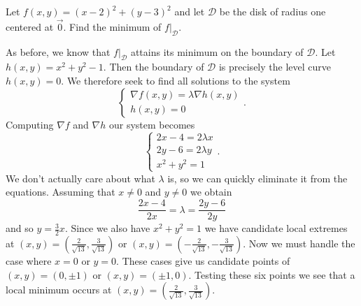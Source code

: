 \begin{example}
	Let $f(x,y)=(x-2)^2+(y-3)^2$
	and let $\mathcal D$ be the disk of radius one centered at $\vec 0$.  Find
	the minimum of $f\big|_{\mathcal D}$.  

	As before, we know that $f\big|_{\mathcal D}$ attains its minimum on the boundary
	of $\mathcal D$.  Let $h(x,y)=x^2+y^2-1$.  Then the boundary of $\mathcal D$
	is precisely the level curve $h(x,y)=0$.
	We therefore seek to find all solutions to the system
	\[
		\begin{cases}
			\nabla f(x,y)=\lambda \nabla h(x,y)\\
			h(x,y)=0
		\end{cases}.
	\]
	Computing $\nabla f$ and $\nabla h$ our system becomes
	\[
		\begin{cases}
			2x-4=2\lambda x\\
			2y-6=2\lambda y\\
			x^2+y^2=1
		\end{cases}.
	\]
	We don't actually care about what $\lambda$ is, so we can quickly eliminate it from the equations.
	Assuming that $x\neq 0$ and $y\neq 0$ we obtain
	\[
		\frac{2x-4}{2x}=\lambda =\frac{2y-6}{2y}
	\]
	and so $y=\tfrac{3}{2}x$.  Since we also have $x^2+y^2=1$ we have candidate local
	extremes at $(x,y)=(\tfrac{2}{\sqrt{13}},
	\tfrac{3}{\sqrt{13}})$ or $(x,y)=(-\tfrac{2}{\sqrt{13}},-\tfrac{3}{\sqrt{13}})$.
	Now we must handle the case where $x=0$ or $y=0$.  These cases give us
	candidate points of $(x,y)=(0,\pm 1)$ or $(x,y)=(\pm 1,0)$.  Testing these six
	points we see that a local minimum occurs at $(x,y)=(\tfrac{2}{\sqrt{13}},
	\tfrac{3}{\sqrt{13}})$.
\end{example}


\begin{exercises}
\end{exercises}

